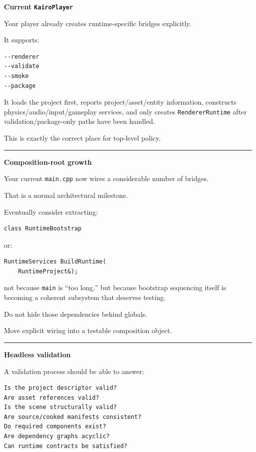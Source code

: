 \textbf{Current \texttt{KairoPlayer}}

Your player already creates runtime-specific bridges explicitly.

It supports:

\begin{verbatim}
--renderer
--validate
--smoke
--package
\end{verbatim}

It loads the project first, reports project/asset/entity information, constructs physics/audio/input/gameplay services, and only creates \texttt{RendererRuntime} after validation/package-only paths have been handled.

This is exactly the correct place for top-level policy.

\begin{center}\rule{0.5\linewidth}{0.5pt}\end{center}

\textbf{Composition-root growth}

Your current \texttt{main.cpp} now wires a considerable number of bridges.

That is a normal architectural milestone.

Eventually consider extracting:

\begin{verbatim}
class RuntimeBootstrap
\end{verbatim}

or:

\begin{verbatim}
RuntimeServices BuildRuntime(
    RuntimeProject&);
\end{verbatim}

not because \texttt{main} is ``too long,'' but because bootstrap sequencing itself is becoming a coherent subsystem that deserves testing.

Do not hide those dependencies behind globals.

Move explicit wiring into a testable composition object.

\begin{center}\rule{0.5\linewidth}{0.5pt}\end{center}

\textbf{Headless validation}

A validation process should be able to answer:

\begin{verbatim}
Is the project descriptor valid?
Are asset references valid?
Is the scene structurally valid?
Are source/cooked manifests consistent?
Do required components exist?
Are dependency graphs acyclic?
Can runtime contracts be satisfied?
\end{verbatim}


